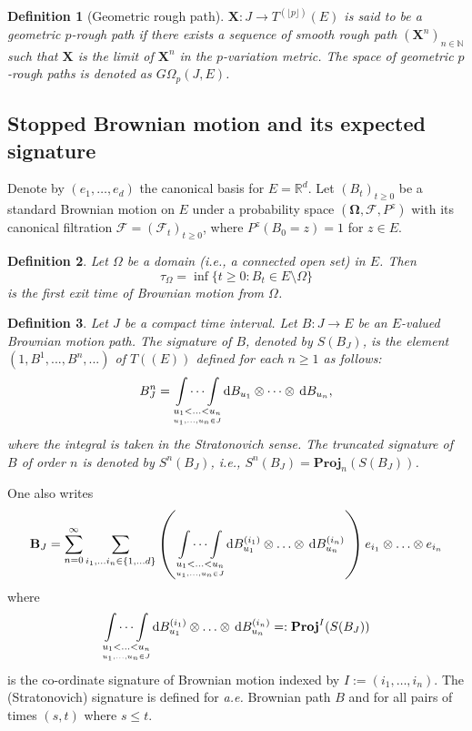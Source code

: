 \documentclass[11pt,a4paper,english,reqno]{amsart}
\theoremstyle{plain}
\newtheorem{definition}{Definition}[section]
\newcommand{\dd}{{\rm d}}
\newcommand{\1}{\mathbbm{1}}
\newcommand{\proj}{\mathbf{Proj}}
\begin{document}
\begin{definition}[Geometric rough path]
$\mathbf{X}: J \rightarrow T^{(\lfloor p \rfloor)}(E)$ is said to be a geometric $p$-rough path if there exists a sequence of smooth rough path $(\mathbf{X}^{n})_{n\in\mathbb{N}}$ such that $\mathbf{X}$ is the limit of $\mathbf{X}^{n}$ in the $p$-variation metric. 
The space of geometric $p$-rough paths is denoted as $G\Omega_p(J, E)$.
\end{definition}

\subsection{Stopped Brownian motion and its expected signature}\label{sec: expected signature}
Denote by $(e_{1}, \ldots, e_d)$ the canonical basis for $E=\mathbb{R}^{d}$. Let $\left( B_{t}\right) _{t\geq 0}$ be a standard Brownian motion on $E$ under a probability space $(\mathbf{\Omega}, \mathcal{F}, P^{z})$ with its canonical filtration $\mathcal{F} = \left(\mathcal{F}_{t}\right)_{t\geq 0}$, where $P^{z}(B_{0} = z) = 1$ for $z \in E$.

\begin{definition}
Let $\Omega $ be a domain (\emph{i.e.}, a connected open set) in $E$. Then $$\tau
_{\Omega }=\inf \{t\geq 0:B_{t}\in E\setminus\Omega\}$$ is the first exit time of
Brownian motion from $\Omega$.
\end{definition}

\begin{definition}
Let $J$ be a compact time interval. Let $B: J \rightarrow E$ be an  $E$-valued Brownian motion path. The signature of $B$, denoted by $S(B_{J})$, is the element $(1,B^{1},...,B^{n},...)$ of $T\left( \left( E\right)
\right) $ defined for each $n\geq 1$ as follows:%
\begin{equation*}
B^{n}_{J}=\underset{\underset{u_{1},\ldots,u_{n}\in J}{u_{1}<\ldots<u_{n}}}{\int \cdots \int }\,\dd B_{u_{1}}\otimes \cdots \otimes \,\dd B_{u_{n}},
\end{equation*}
where the integral is taken in the Stratonovich sense. The truncated signature of $B$ of order $n$ is denoted by $S^{n}(B_{J})$, \emph{i.e.}, $%
S^{n}(B_{J}) = \proj_{n}(S(B_{J}))$.
\end{definition}

One also writes
\begin{equation*}
\mathbf{B}_{J}=\sum_{n=0}^{\infty }\sum_{i_{1},\ldots i_{n}\in \{1,\ldots
d\}}\left( \underset{\underset{u_{1},\ldots,u_{n}\in J}{u_{1}<\ldots<u_{n}}}{\int
\cdots \int }\,\dd B_{u_{1}}^{(i_{1})}\otimes \ldots \otimes
\,\dd B_{u_{n}}^{(i_{n})}\right) e_{i_{1}}\otimes \ldots \otimes e_{i_{n}}
\end{equation*}
where $$ \underset{\underset{u_{1},\ldots,u_{n}\in J}{u_{1}<\ldots<u_{n}}}{\int
\cdots \int }\,\dd B_{u_{1}}^{(i_{1})}\otimes \ldots \otimes\,\dd B_{u_{n}}^{(i_{n})} =: \proj^{I}(S(B_{J}))$$ is the co-ordinate signature of Brownian motion indexed by $I:= (i_{1}, \ldots, i_{n})$. The (Stratonovich) signature is defined for \emph{a.e.} Brownian path $B$ and for all pairs of times $(s, t)$ where $s \leq t$. 
\end{document}
